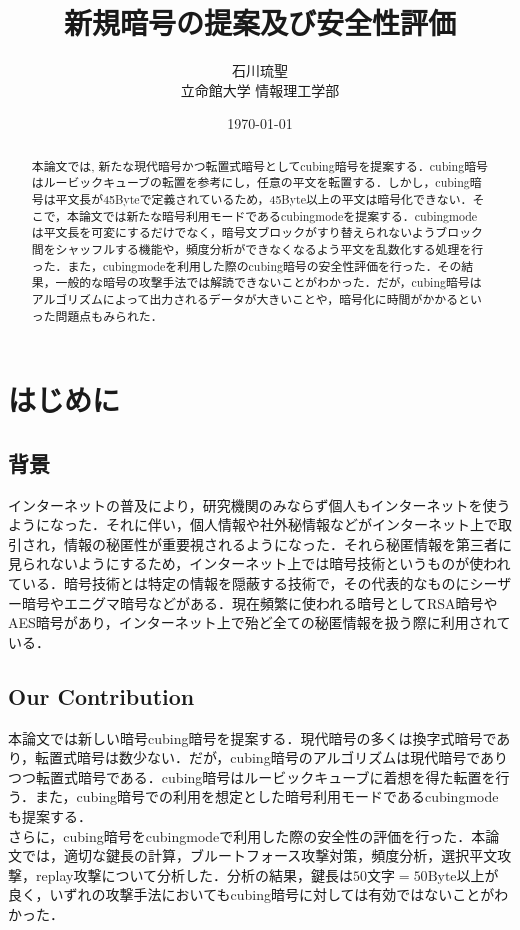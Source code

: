 \documentclass[titlepage]{jarticle}
\title{新規暗号の提案及び安全性評価}
\author{石川琉聖\\立命館大学 情報理工学部}
\date{\today}
\begin{document}
\maketitle

\begin{abstract}
本論文では, 新たな現代暗号かつ転置式暗号としてcubing暗号を提案する．cubing暗号はルービックキューブの転置を参考にし，任意の平文を転置する．しかし，cubing暗号は平文長が45Byteで定義されているため，45Byte以上の平文は暗号化できない．そこで，本論文では新たな暗号利用モードであるcubingmodeを提案する．cubingmodeは平文長を可変にするだけでなく，暗号文ブロックがすり替えられないようブロック間をシャッフルする機能や，頻度分析ができなくなるよう平文を乱数化する処理を行った．また，cubingmodeを利用した際のcubing暗号の安全性評価を行った．その結果，一般的な暗号の攻撃手法では解読できないことがわかった．だが，cubing暗号はアルゴリズムによって出力されるデータが大きいことや，暗号化に時間がかかるといった問題点もみられた．
\end{abstract}

\tableofcontents
\newpage

\section{はじめに}
\subsection{背景}
インターネットの普及により，研究機関のみならず個人もインターネットを使うようになった．それに伴い，個人情報や社外秘情報などがインターネット上で取引され，情報の秘匿性が重要視されるようになった．それら秘匿情報を第三者に見られないようにするため，インターネット上では暗号技術というものが使われている．暗号技術とは特定の情報を隠蔽する技術で，その代表的なものにシーザー暗号やエニグマ暗号などがある．現在頻繁に使われる暗号としてRSA暗号やAES暗号があり，インターネット上で殆ど全ての秘匿情報を扱う際に利用されている．\\

\subsection{Our Contribution}
本論文では新しい暗号cubing暗号を提案する．現代暗号の多くは換字式暗号であり，転置式暗号は数少ない．だが，cubing暗号のアルゴリズムは現代暗号でありつつ転置式暗号である．cubing暗号はルービックキューブに着想を得た転置を行う．また，cubing暗号での利用を想定とした暗号利用モードであるcubingmodeも提案する．\\
さらに，cubing暗号をcubingmodeで利用した際の安全性の評価を行った．本論文では，適切な鍵長の計算，ブルートフォース攻撃対策，頻度分析，選択平文攻撃，replay攻撃について分析した．分析の結果，鍵長は\(50\)文字\(=50\text{Byte}\)以上が良く，いずれの攻撃手法においてもcubing暗号に対しては有効ではないことがわかった．
\end{document}
